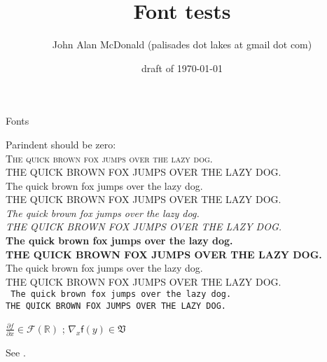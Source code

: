 \documentclass{PalisadesLakesArticle}
\title{Font tests}
\author{John Alan McDonald 
(palisades dot lakes at gmail dot com)}
\date{draft of \today}
\begin{document}
\def\sharedFolder{../shared/}

\begin{plSection}{Fonts}

Parindent should be zero:\\
\textsc{
The quick brown fox jumps over the lazy dog.\\
THE QUICK BROWN FOX JUMPS OVER THE LAZY DOG.\\
}
\textrm{
The quick brown fox jumps over the lazy dog.\\
THE QUICK BROWN FOX JUMPS OVER THE LAZY DOG.\\
}
\textit{
The quick brown fox jumps over the lazy dog.\\
THE QUICK BROWN FOX JUMPS OVER THE LAZY DOG.\\
}
\textbf{
The quick brown fox jumps over the lazy dog.\\
THE QUICK BROWN FOX JUMPS OVER THE LAZY DOG.\\
}
\textsf{
The quick brown fox jumps over the lazy dog.\\
THE QUICK BROWN FOX JUMPS OVER THE LAZY DOG.\\
}
\texttt{
The quick brown fox jumps over the lazy dog.\\
THE QUICK BROWN FOX JUMPS OVER THE LAZY DOG.\\
}

$
\frac
{\partial f}{\partial x} 
\in \mathcal{F}\left(\mathbb{R}\right)$
;
$\nabla_{x} \mathsf{f} (y) \in \mathfrak{V}$

See 
.



\end{plSection}
\end{document}
